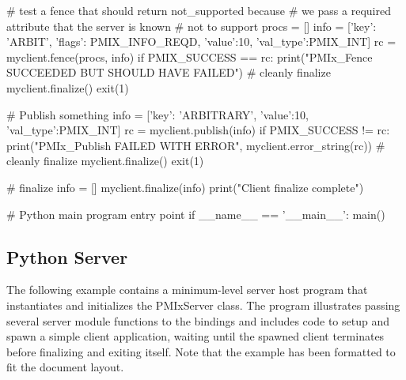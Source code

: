 \begin{codepar}
    # test a fence that should return not_supported because
    # we pass a required attribute that the server is known
    # not to support
    procs = []
    info = [{'key': 'ARBIT', 'flags': PMIX_INFO_REQD,
             'value':10, 'val_type':PMIX_INT}]
    rc = myclient.fence(procs, info)
    if PMIX_SUCCESS == rc:
        print("PMIx_Fence SUCCEEDED BUT SHOULD HAVE FAILED")
        # cleanly finalize
        myclient.finalize()
        exit(1)

    # Publish something
    info = [{'key': 'ARBITRARY', 'value':10, 'val_type':PMIX_INT}]
    rc = myclient.publish(info)
    if PMIX_SUCCESS != rc:
        print("PMIx_Publish FAILED WITH ERROR",
              myclient.error_string(rc))
        # cleanly finalize
        myclient.finalize()
        exit(1)

    # finalize
    info = []
    myclient.finalize(info)
    print("Client finalize complete")

# Python main program entry point
if __name__ == '__main__':
    main()
\end{codepar}
\pyspecificend


\subsection{Python Server}

The following example contains a minimum-level server host program that instantiates and initializes the PMIxServer class. The program illustrates passing several server module functions to the bindings and includes code to setup and spawn a simple client application, waiting until the spawned client terminates before finalizing and exiting itself. Note that the example has been formatted to fit the document layout.

